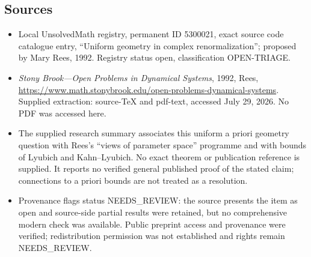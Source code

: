 \documentclass[11pt]{article}
\begin{document}
\subsection{Sources}
\begin{itemize}
\item Local UnsolvedMath registry, permanent ID 5300021, exact source code catalogue entry, ``Uniform geometry in complex renormalization''; proposed by Mary Rees, 1992. Registry status open, classification OPEN-TRIAGE.
\item \emph{Stony Brook---Open Problems in Dynamical Systems}, 1992, Rees, \url{https://www.math.stonybrook.edu/open-problems-dynamical-systems}. Supplied extraction: source-TeX and pdf-text, accessed July 29, 2026. No PDF was accessed here.
\item The supplied research summary associates this uniform a priori geometry question with Rees's ``views of parameter space'' programme and with bounds of Lyubich and Kahn--Lyubich. No exact theorem or publication reference is supplied. It reports no verified general published proof of the stated claim; connections to a priori bounds are not treated as a resolution.
\item Provenance flags status NEEDS\_REVIEW: the source presents the item as open and source-side partial results were retained, but no comprehensive modern check was available. Public preprint access and provenance were verified; redistribution permission was not established and rights remain NEEDS\_REVIEW.
\end{itemize}
\end{document}
